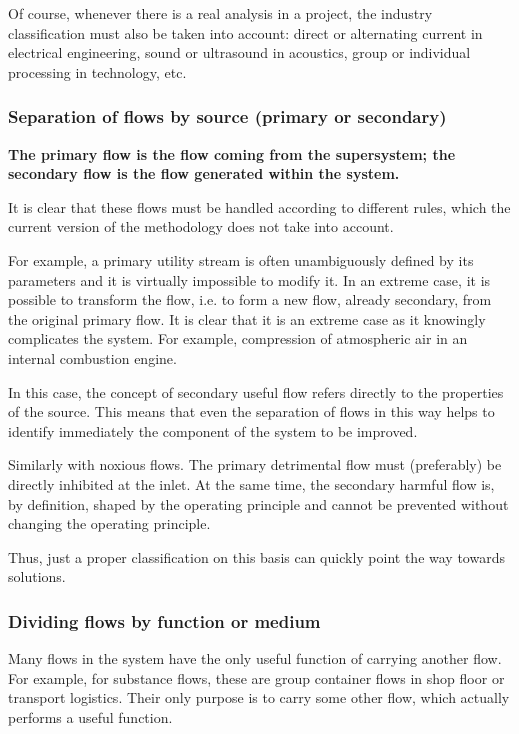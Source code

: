 \documentclass[a4paper,11pt]{article}
\begin{document}
Of course, whenever there is a real analysis in a project, the industry
classification must also be taken into account: direct or alternating current
in electrical engineering, sound or ultrasound in acoustics, group or
individual processing in technology, etc.

\subsubsection{Separation of flows by source (primary or secondary)}

\textbf{The primary flow is the flow coming from the supersystem; the
  secondary flow is the flow generated within the system.}

It is clear that these flows must be handled according to different rules,
which the current version of the methodology does not take into account.

For example, a primary utility stream is often unambiguously defined by its
parameters and it is virtually impossible to modify it. In an extreme case, it
is possible to transform the flow, i.e. to form a new flow, already secondary,
from the original primary flow. It is clear that it is an extreme case as it
knowingly complicates the system. For example, compression of atmospheric air
in an internal combustion engine.

In this case, the concept of secondary useful flow refers directly to the
properties of the source. This means that even the separation of flows in this
way helps to identify immediately the component of the system to be improved.

Similarly with noxious flows. The primary detrimental flow must (preferably)
be directly inhibited at the inlet. At the same time, the secondary harmful
flow is, by definition, shaped by the operating principle and cannot be
prevented without changing the operating principle.

Thus, just a proper classification on this basis can quickly point the way
towards solutions.

\subsubsection{Dividing flows by function or medium}

Many flows in the system have the only useful function of carrying another
flow. For example, for substance flows, these are group container flows in
shop floor or transport logistics. Their only purpose is to carry some other
flow, which actually performs a useful function.
\end{document}
